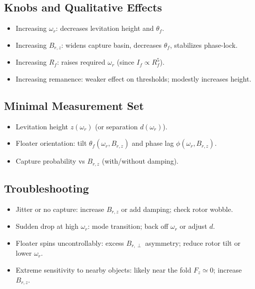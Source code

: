 \documentclass[11pt]{article}
\theoremstyle{definition}
\theoremstyle{plain}
\begin{document}
\subsection{Knobs and Qualitative Effects}
\begin{itemize}[leftmargin=1.5em]
  \item Increasing \(\omega_r\): decreases levitation height and \(\theta_f\).
  \item Increasing \(B_{r,z}\): widens capture basin, decreases \(\theta_f\), stabilizes phase-lock.
  \item Increasing \(R_f\): raises required \(\omega_r\) (since \(I_f\propto R_f^5\)).
  \item Increasing remanence: weaker effect on thresholds; modestly increases height.
\end{itemize}

\subsection{Minimal Measurement Set}
\begin{itemize}[leftmargin=1.5em]
  \item Levitation height \(z(\omega_r)\) (or separation \(d(\omega_r)\)).
  \item Floater orientation: tilt \(\theta_f(\omega_r,B_{r,z})\) and phase lag \(\phi(\omega_r,B_{r,z})\).
  \item Capture probability vs \(B_{r,z}\) (with/without damping).
\end{itemize}

\subsection{Troubleshooting}
\begin{itemize}[leftmargin=1.5em]
  \item Jitter or no capture: increase \(B_{r,z}\) or add damping; check rotor wobble.
  \item Sudden drop at high \(\omega_r\): mode transition; back off \(\omega_r\) or adjust \(d\).
  \item Floater spins uncontrollably: excess \(B_{r,\perp}\) asymmetry; reduce rotor tilt or lower \(\omega_r\).
  \item Extreme sensitivity to nearby objects: likely near the fold \(F_z\simeq 0\); increase \(B_{r,z}\).
\end{itemize}

\end{document}
